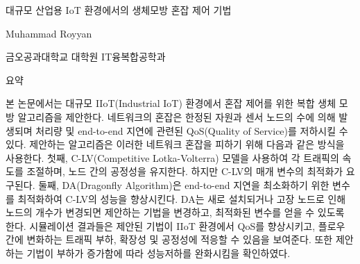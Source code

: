 \begin{center}      
	\vspace*{0.5 cm}
	\begin{spacing}{1.6}
		{\fontsize{22}{30}\selectfont 대규모 산업용 IoT 환경에서의 생체모방 혼잡 제어 기법}
	\end{spacing}
	\vspace{1 cm}
	{\fontsize{14}{20}\selectfont Muhammad Royyan}
	
	\vspace{1 cm}
	{\fontsize{14}{20}\selectfont 금오공과대학교 대학원 IT융복합공학과}
	
	\vspace{1.5 cm}
	{\fontsize{14}{20}\selectfont 요약}
	
	\vspace{1 cm}
\end{center}


본 논문에서는 대규모 IIoT(Industrial IoT) 환경에서 혼잡 제어를 위한 복합 생체 모방 알고리즘을 제안한다. 네트워크의 혼잡은 한정된 자원과 센서 노드의 수에 의해 발생되며 처리량 및 end-to-end 지연에 관련된 QoS(Quality of Service)를 저하시킬 수 있다. 제안하는 알고리즘은 이러한 네트워크 혼잡을 피하기 위해 다음과 같은 방식을 사용한다. 첫째, C-LV(Competitive Lotka-Volterra) 모델을 사용하여 각 트래픽의 속도를 조절하며, 노드 간의 공정성을 유지한다. 하지만 C-LV의 매개 변수의 최적화가 요구된다. 둘째, DA(Dragonfly Algorithm)은 end-to-end 지연을 최소화하기 위한 변수를 최적화하여 C-LV의 성능을 향상시킨다. DA는 새로 설치되거나 고장 노드로 인해 노드의 개수가 변경되면 제안하는 기법을 변경하고, 최적화된 변수를 얻을 수 있도록 한다. 시뮬레이션 결과들은 제안된 기법이 IIoT 환경에서 QoS를 향상시키고, 플로우 간에 변화하는 트래픽 부하, 확장성 및 공정성에 적응할 수 있음을 보여준다. 또한 제안하는 기법이 부하가 증가함에 따라 성능저하를 완화시킴을 확인하였다.
%

\newpage